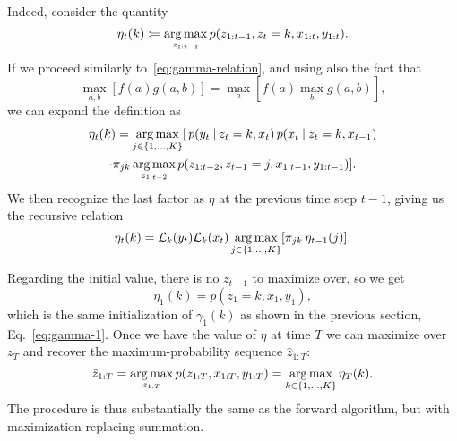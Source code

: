 \documentclass[
  10pt, twocolumn, headings=normal,
  footlines=1, DIV=calc
]{scrartcl}
\begin{document}
Indeed, consider the quantity
\begin{equation}
  \eta_{t}(k) \coloneq \operatorname*{arg\,max}_{z_{1:t-1}}
    p(z_{1:t-1}, z_{t} = k, x_{1:t}, y_{1:t}).
\end{equation}
If we proceed similarly to~\eqref{eq:gamma-relation}, and using also the fact
that
\begin{equation}
  \max_{a,b} [f(a) g(a, b)] = \max_{a}[f(a) \max_{b} g(a, b)],
\end{equation}
we can expand the definition as
\begin{multline}
  \eta_{t}(k) = \operatorname*{arg\,max}_{j \in \{1, \ldots, K\}}
    [\, p(y_{t} \:\vert\: z_{t} = k, x_{t}) \,
    p(x_{t} \:\vert\: z_{t} = k, x_{t-1}) \\
    \cdot \pi_{jk} \operatorname*{arg\,max}_{z_{1:t-2}}
    p(z_{1:t-2}, z_{t-1} = j, x_{1:t-1}, y_{1:t-1})].
\end{multline}
We then recognize the last factor as $\eta$ at the previous time step $t-1$,
giving us the recursive relation
\begin{equation}
  \eta_{t}(k) = \mathcal{L}_{k}(y_{t}) \mathcal{L}_{k}(x_{t})
  \operatorname*{arg\,max}_{j \in \{1, \ldots, K\}} [ \pi_{jk} \, \eta_{t-1}(j)].
\end{equation}

Regarding the initial value, there is no $z_{t-1}$ to maximize over, so we get
\begin{equation}
  \eta_{1}(k) = p(z_{1} = k, x_{1}, y_{1}),
\end{equation}
which is the same initialization of $\gamma_{1}(k)$ as shown in the previous
section, Eq.~\eqref{eq:gamma-1}. Once we have the value of $\eta$ at time $T$ we
can maximize over $z_{T}$ and recover the maximum-probability sequence
$\hat{z}_{1:T}$:
\begin{equation}
  \hat{z}_{1:T} = 
  \operatorname*{arg\,max}_{z_{1:T}} p(z_{1:T}, x_{1:T}, y_{1:T}) =
  \operatorname*{arg\,max}_{k \in \{1, \ldots, K\}} \eta_{T}(k).
\end{equation}
The procedure is thus substantially the same as the forward algorithm, but with
maximization replacing summation.

\printbibliography
\end{document}
